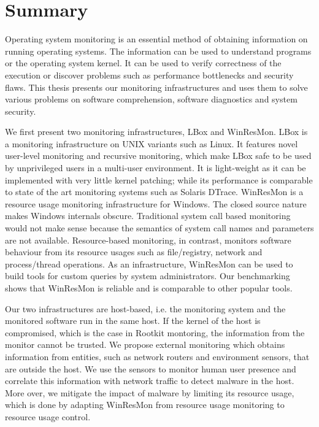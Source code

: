 \chapter{Summary}

Operating system monitoring is an essential method of obtaining
information on running operating systems.
The information can be used to understand programs or
the operating system kernel.
It can be used to verify correctness of the execution or
discover problems such as performance bottlenecks and security flaws.
This thesis presents our monitoring infrastructures and uses them to solve
various problems on software comprehension, software diagnostics and
system security.

We first present two monitoring infrastructures, LBox and WinResMon.
LBox is a monitoring infrastructure on UNIX variants such as Linux.
It features novel user-level monitoring and recursive monitoring, which
make LBox safe to be used by unprivileged users in a multi-user environment.
It is light-weight as it can be implemented with very little kernel patching;
while its performance is comparable to state of the art monitoring systems
such as Solaris DTrace.
WinResMon is a resource usage monitoring infrastructure for Windows.
The closed source nature makes Windows internals obscure.
Traditional system call based monitoring would not make sense
because the semantics of system call names and parameters are not available.
Resource-based monitoring, in contrast,
monitors software behaviour from its resource usages such as
file/registry, network and process/thread operations.
As an infrastructure, WinResMon can be used to build tools for
custom queries by system administrators.
Our benchmarking shows that WinResMon is reliable and
is comparable to other popular tools.

Our two infrastructures are host-based, i.e.
the monitoring system and the monitored software run in the same host.
If the kernel of the host is compromised,
which is the case in Rootkit montoring,
the information from the monitor cannot be trusted.
We propose external monitoring which obtains information from entities,
such as network routers and environment sensors, that are outside the host.
We use the sensors to monitor human user presence and correlate
this information with network traffic to detect malware in the host.
More over, we mitigate the impact of malware by limiting its resource usage,
which is done by adapting WinResMon from resource usage monitoring to
resource usage control.

